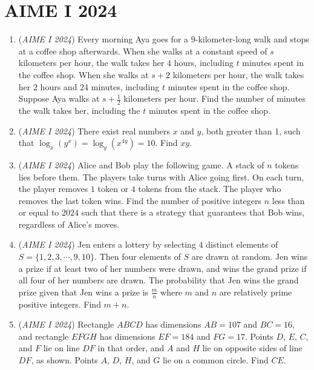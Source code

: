 \section{AIME I 2024}
        \begin{enumerate}
        	\item (\textit{AIME I 2024}) Every morning Aya goes for a $9$-kilometer-long walk and stops at a coffee shop afterwards. When she walks at a constant speed of $s$ kilometers per hour, the walk takes her $4$ hours, including $t$ minutes spent in the coffee shop. When she walks at $s + 2$ kilometers per hour, the walk takes her $2$ hours and $24$ minutes, including $t$ minutes spent in the coffee shop. Suppose Aya walks at $s + \frac{1}{2}$
kilometers per hour. Find the number of minutes the walk takes her, including the $t$ minutes spent in the coffee shop.


 

	\item (\textit{AIME I 2024}) There exist real numbers $x$ and $y$, both greater than 1, such that $\log_x(y^x) = \log_y(x^{4y}) = 10.$ Find $xy$.


 

	\item (\textit{AIME I 2024}) Alice and Bob play the following game. A stack of $n$ tokens lies before them. The players take turns with Alice going first. On each turn, the player removes $1$ token or $4$ tokens from the stack. The player who removes the last token wins. Find the number of positive integers $n$ less than or equal to $2024$ such that there is a strategy that guarantees that Bob wins, regardless of Alice’s moves.


 

	\item (\textit{AIME I 2024}) Jen enters a lottery by selecting $4$ distinct elements of $S=\{1,2,3,\cdots,9,10\}.$ Then four elements of $S$ are drawn at random. Jen wins a prize if at least two of her numbers were drawn, and wins the grand prize if all four of her numbers are drawn. The probability that Jen wins the grand prize given that Jen wins a prize is $\frac{m}{n}$ where $m$ and $n$ are relatively prime positive integers. Find $m+n$.


 

	\item (\textit{AIME I 2024}) Rectangle $ABCD$ has dimensions $AB = 107$ and $BC = 16$, and rectangle $EFGH$ has dimensions $EF = 184$ and $FG = 17$. Points $D$, $E$, $C$, and $F$ lie on line $DF$ in that order, and $A$ and $H$ lie on opposite sides of line $DF$, as shown. Points $A$, $D$, $H$, and $G$ lie on a common circle. Find $CE$.



\end{enumerate}
